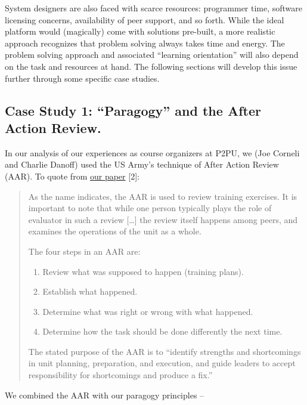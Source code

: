 System designers are also faced with scarce resources: programmer time,
software licensing concerns, availability of peer support, and so forth.
While the ideal platform would (magically) come with solutions
pre-built, a more realistic approach recognizes that problem solving
always takes time and energy. The problem solving approach and
associated ``learning orientation'' will also depend on the task and
resources at hand. The following sections will develop this issue
further through some specific case studies.

\hypertarget{case-study-1-paragogy-and-the-after-action-review.}{%
\subsection{Case Study 1: ``Paragogy'' and the After Action
Review.}\label{case-study-1-paragogy-and-the-after-action-review.}}

In our analysis of our experiences as course organizers at P2PU, we (Joe
Corneli and Charlie Danoff) used the US Army's technique of After Action
Review (AAR). To quote from
\href{http://paragogy.net/ParagogyPaper2}{our paper} {{[}2{]}}:

\begin{quote}
As the name indicates, the AAR is used to review training exercises. It
is important to note that while one person typically plays the role of
evaluator in such a review {{[}\ldots{}{]}} the review itself happens
among peers, and examines the operations of the unit as a whole.

The four steps in an AAR are:

\begin{enumerate}
\def\labelenumi{\arabic{enumi}.}
\item
  Review what was supposed to happen (training plans).
\item
  Establish what happened.
\item
  Determine what was right or wrong with what happened.
\item
  Determine how the task should be done differently the next time.
\end{enumerate}

The stated purpose of the AAR is to ``identify strengths and
shortcomings in unit planning, preparation, and execution, and guide
leaders to accept responsibility for shortcomings and produce a fix.''
\end{quote}

We combined the AAR with our paragogy principles --

